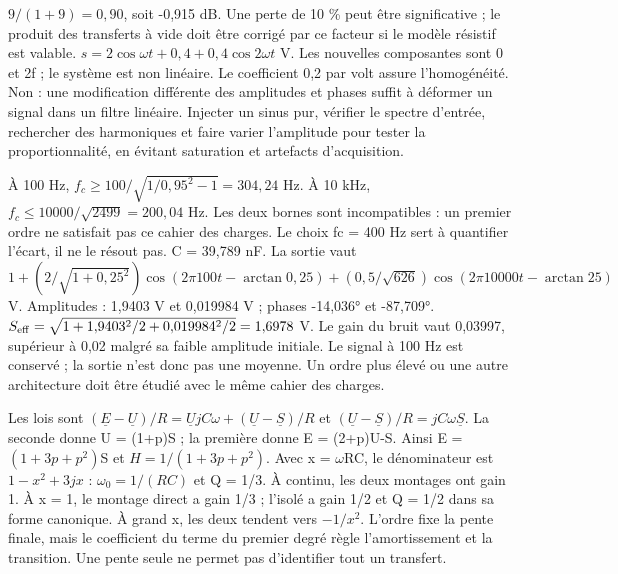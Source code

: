 $9/(1+9)=0{,}90$, soit -0,915 dB. Une perte de 10 \% peut être significative ; le produit des transferts à vide doit être corrigé par ce facteur si le modèle résistif est valable.
$s=2\cos\omega t+0{,}4+0{,}4\cos2\omega t$ V. Les nouvelles composantes sont 0 et 2f ; le système est non linéaire. Le coefficient 0,2 par volt assure l’homogénéité.
Non : une modification différente des amplitudes et phases suffit à déformer un signal dans un filtre linéaire. Injecter un sinus pur, vérifier le spectre d’entrée, rechercher des harmoniques et faire varier l’amplitude pour tester la proportionnalité, en évitant saturation et artefacts d’acquisition.


À 100 Hz, $f_c\geq100/\sqrt{1/0{,}95^2-1}=304{,}24$ Hz. À 10 kHz, $f_c\leq10000/\sqrt{2499}=200{,}04$ Hz. Les deux bornes sont incompatibles : un premier ordre ne satisfait pas ce cahier des charges. Le choix fc = 400 Hz sert à quantifier l’écart, il ne le résout pas. C = 39,789 nF. La sortie vaut $1+(2/\sqrt{1+0{,}25^2})\cos(2\pi100t-\arctan0{,}25)+(0{,}5/\sqrt{626})\cos(2\pi10000t-\arctan25)$ V. Amplitudes : 1,9403 V et 0,019984 V ; phases -14,036° et -87,709°. $S_{\rm eff}=\sqrt{1+1{,}9403^2/2+0{,}019984^2/2}=1{,}6978$ V. Le gain du bruit vaut 0,03997, supérieur à 0,02 malgré sa faible amplitude initiale. Le signal à 100 Hz est conservé ; la sortie n’est donc pas une moyenne. Un ordre plus élevé ou une autre architecture doit être étudié avec le même cahier des charges.

Les lois sont $(\underline E-\underline U)/R=\underline UjC\omega+(\underline U-\underline S)/R$ et $(\underline U-\underline S)/R=jC\omega\underline S$. La seconde donne U = (1+p)S ; la première donne E = (2+p)U-S. Ainsi E = $(1+3p+p^2)$S et $H=1/(1+3p+p^2)$. Avec x = \ensuremath{\omega}RC, le dénominateur est $1-x^2+3jx$ : $\omega_0=1/(RC)$ et Q = 1/3. À continu, les deux montages ont gain 1. À x = 1, le montage direct a gain 1/3 ; l’isolé a gain 1/2 et Q = 1/2 dans sa forme canonique. À grand x, les deux tendent vers $-1/x^2$. L’ordre fixe la pente finale, mais le coefficient du terme du premier degré règle l’amortissement et la transition. Une pente seule ne permet pas d’identifier tout un transfert.

